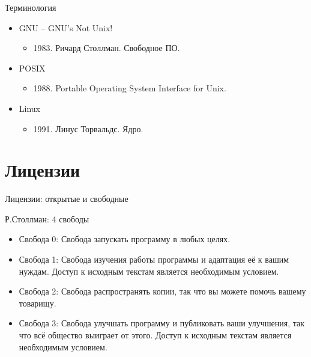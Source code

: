 \documentclass[ignorenonframetext, professionalfonts, hyperref={pdftex, unicode}]{beamer}
\begin{document}
\begin{frame}{Терминология}
	\begin{itemize}
		\item GNU -- GNU's Not Unix!
		\begin{itemize}
			\item 1983. Ричард Столлман. Свободное ПО.
		\end{itemize}

		\pause

		\item POSIX
		\begin{itemize}
			\item 1988. Portable Operating System Interface for Unix. 
		\end{itemize}

		\pause

		\item Linux
		\begin{itemize}
			\item 1991. Линус Торвальдс. Ядро.
		\end{itemize}

	\end{itemize}
\end{frame}

\section{Лицензии}

\begin{frame}{Лицензии: открытые и свободные}

	\begin{block}{ Р.Столлман: 4 свободы}

		\begin{itemize}
			\item Свобода 0: Свобода запускать программу в любых целях.
			\item Свобода 1: Свобода изучения работы программы и адаптация её к вашим нуждам. 
				Доступ к исходным текстам является необходимым условием.
			\item Свобода 2: Свобода распространять копии,  так что вы можете помочь вашему товарищу.
			\item Свобода 3: Свобода улучшать программу и публиковать ваши улучшения,
				так что всё общество выиграет от этого.
				Доступ к исходным текстам является необходимым условием.
		\end{itemize}
	\end{block}


\end{frame}
\end{document}
